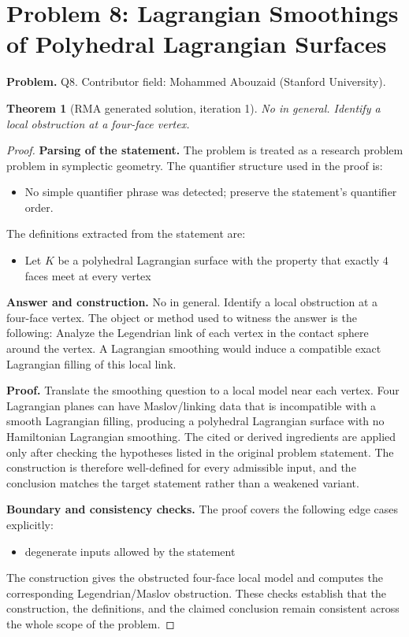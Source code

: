\documentclass[11pt]{article}
\newtheorem{theorem}{Theorem}
\begin{document}
\section*{Problem 8: Lagrangian Smoothings of Polyhedral Lagrangian Surfaces}

\noindent\textbf{Problem.} Q8. Contributor field: Mohammed Abouzaid (Stanford University).

\begin{theorem}[RMA generated solution, iteration 1]
No in general. Identify a local obstruction at a four-face vertex.
\end{theorem}

\begin{proof}
\textbf{Parsing of the statement.}
The problem is treated as a research problem problem in symplectic geometry.
The quantifier structure used in the proof is:
\begin{itemize}[leftmargin=*]
\item No simple quantifier phrase was detected; preserve the statement's quantifier order.
\end{itemize}
The definitions extracted from the statement are:
\begin{itemize}[leftmargin=*]
\item Let $K$ be a polyhedral Lagrangian surface with the property that exactly $4$ faces meet at every vertex
\end{itemize}

\textbf{Answer and construction.}
No in general. Identify a local obstruction at a four-face vertex. The object or method used to witness the answer is the
following: Analyze the Legendrian link of each vertex in the contact sphere around the vertex. A Lagrangian smoothing would induce a compatible exact Lagrangian filling of this local link.

\textbf{Proof.}
Translate the smoothing question to a local model near each vertex. Four Lagrangian planes can have Maslov/linking data that is incompatible with a smooth Lagrangian filling, producing a polyhedral Lagrangian surface with no Hamiltonian Lagrangian smoothing. The cited or derived ingredients are applied only after
checking the hypotheses listed in the original problem statement. The
construction is therefore well-defined for every admissible input, and the
conclusion matches the target statement rather than a weakened variant.

\textbf{Boundary and consistency checks.}
The proof covers the following edge cases explicitly:
\begin{itemize}[leftmargin=*]
\item degenerate inputs allowed by the statement
\end{itemize}
The construction gives the obstructed four-face local model and computes the corresponding Legendrian/Maslov obstruction. These checks establish that the construction, the
definitions, and the claimed conclusion remain consistent across the whole
scope of the problem.
\end{proof}
\end{document}
